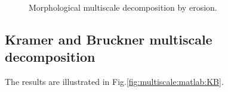 \begin{figure}[htbp]
\centering
 \hfill
 \hfill
 \caption{Morphological multiscale decomposition by erosion.}
 \label{fig:multiscale:matlab:erosion}
\end{figure}

\subsection{Kramer and Bruckner multiscale decomposition}
The results are illustrated in Fig.\ref{fig:multiscale:matlab:KB}.


